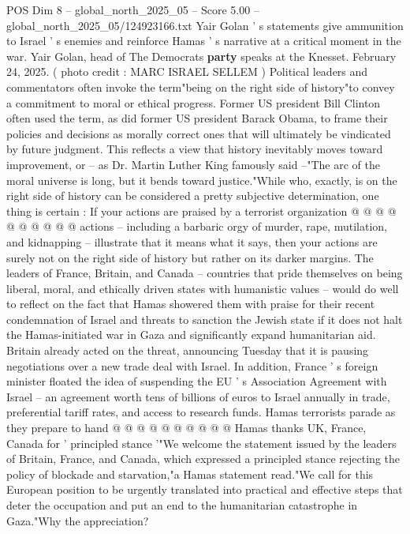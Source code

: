 \begin{textsample}{POS Dim 8 – global\_north\_2025\_05 – Score 5.00 – global\_north\_2025\_05/124923166.txt}  \label{ex:f8_pos_408}
Yair Golan ' s statements give ammunition to Israel ' s enemies and reinforce Hamas ' s narrative at a critical moment in the war.
Yair Golan, head of The Democrats \textbf{party} speaks at the Knesset.
February 24, 2025. ( photo credit : MARC ISRAEL SELLEM ) Political leaders and commentators often invoke the term"being on the right side of history"to convey a commitment to moral or ethical progress.
Former US president Bill Clinton often used the term, as did former US president Barack Obama, to frame their policies and decisions as morally correct ones that will ultimately be vindicated by future judgment.
This reflects a view that history inevitably moves toward improvement, or -- as Dr.
Martin Luther King famously said --"The arc of the moral universe is long, but it bends toward justice."While who, exactly, is on the right side of history can be considered a pretty subjective determination, one thing is certain : If your actions are praised by a terrorist organization @ @ @ @ @ @ @ @ @ @ actions -- including a barbaric orgy of murder, rape, mutilation, and kidnapping -- illustrate that it means what it says, then your actions are surely not on the right side of history but rather on its darker margins.
The leaders of France, Britain, and Canada -- countries that pride themselves on being liberal, moral, and ethically driven states with humanistic values -- would do well to reflect on the fact that Hamas showered them with praise for their recent condemnation of Israel and threats to sanction the Jewish state if it does not halt the Hamas-initiated war in Gaza and significantly expand humanitarian aid.
Britain already acted on the threat, announcing Tuesday that it is pausing negotiations over a new trade deal with Israel.
In addition, France ' s foreign minister floated the idea of suspending the EU ' s Association Agreement with Israel -- an agreement worth tens of billions of euros to Israel annually in trade, preferential tariff rates, and access to research funds.
Hamas terrorists parade as they prepare to hand @ @ @ @ @ @ @ @ @ @ Hamas thanks UK, France, Canada for ' principled stance '"We welcome the statement issued by the leaders of Britain, France, and Canada, which expressed a principled stance rejecting the policy of blockade and starvation,"a Hamas statement read."We call for this European position to be urgently translated into practical and effective steps that deter the occupation and put an end to the humanitarian catastrophe in Gaza."Why the appreciation?

\end{textsample}
